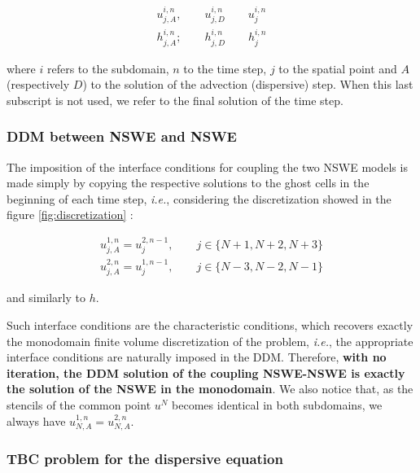 \begin{equation*}
	\begin{gathered}
		u^{i,n}_{j,A}, \qquad u^{i,n}_{j,D} \qquad u^{i,n}_{j}  \\
		h^{i,n}_{j,A}; \qquad h^{i,n}_{j,D} \qquad h^{i,n}_{j}
	\end{gathered}
\end{equation*}

\noindent where $i$ refers to the subdomain, $n$ to the time step, $j$ to the spatial point and $A$ (respectively $D$) to the solution of the advection (dispersive) step. When this last subscript is not used, we refer to the final solution of the time step.

\subsubsection{DDM between NSWE and NSWE}

\indent The imposition of the interface conditions for coupling the two NSWE models is made simply by copying the respective solutions to the ghost cells in the beginning of each time step, \emph{i.e.}, considering the discretization showed in the figure \ref{fig:discretization} : 

\begin{equation}
	\label{eq:IBCNSWE}
	\begin{gathered}
		u^{1,n}_{j,A} = u^{2,n-1}_{j}, \qquad j \in \{N+1,N+2,N+3\} \\
		u^{2,n}_{j,A} = u^{1,n-1}_{j}, \qquad j \in \{N-3,N-2,N-1\}
	\end{gathered}
\end{equation}

\noindent and similarly to $h$.

\indent Such interface conditions are the characteristic conditions, which recovers exactly the monodomain finite volume discretization of the problem, \emph{i.e.}, the appropriate interface conditions are naturally imposed in the DDM. Therefore, \textbf{with no iteration, the DDM solution of the coupling NSWE-NSWE is exactly the solution of the NSWE in the monodomain}. We also notice that, as the stencils of the common point $u^N$ becomes identical in both subdomains, we always have $u^{1,n}_{N,A} = u^{2,n}_{N,A}$.

\subsubsection{TBC problem for the dispersive equation}

